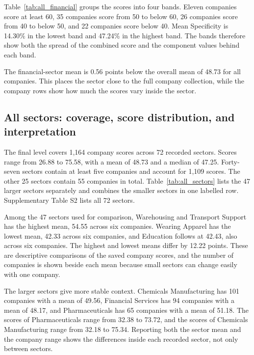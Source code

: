 Table~\ref{tab:all_financial} groups the scores into four bands. Eleven companies score at least 60, 35 companies score from 50 to below 60, 26 companies score from 40 to below 50, and 22 companies score below 40. Mean Specificity is 14.30\% in the lowest band and 47.24\% in the highest band. The bands therefore show both the spread of the combined score and the component values behind each band.

The financial-sector mean is 0.56 points below the overall mean of 48.73 for all companies. This places the sector close to the full company collection, while the company rows show how much the scores vary inside the sector.

\subsection{All sectors: coverage, score distribution, and interpretation}
\label{sec:all_sectors}

The final level covers 1,164 company scores across 72 recorded sectors. Scores range from 26.88 to 75.58, with a mean of 48.73 and a median of 47.25. Forty-seven sectors contain at least five companies and account for 1,109 scores. The other 25 sectors contain 55 companies in total. Table~\ref{tab:all_sectors} lists the 47 larger sectors separately and combines the smaller sectors in one labelled row. Supplementary Table S2 lists all 72 sectors.

Among the 47 sectors used for comparison, Warehousing and Transport Support has the highest mean, 54.55 across six companies. Wearing Apparel has the lowest mean, 42.33 across six companies, and Education follows at 42.43, also across six companies. The highest and lowest means differ by 12.22 points. These are descriptive comparisons of the saved company scores, and the number of companies is shown beside each mean because small sectors can change easily with one company.

The larger sectors give more stable context. Chemicals Manufacturing has 101 companies with a mean of 49.56, Financial Services has 94 companies with a mean of 48.17, and Pharmaceuticals has 65 companies with a mean of 51.18. The scores of Pharmaceuticals range from 32.38 to 73.72, and the scores of Chemicals Manufacturing range from 32.18 to 75.34. Reporting both the sector mean and the company range shows the differences inside each recorded sector, not only between sectors.

